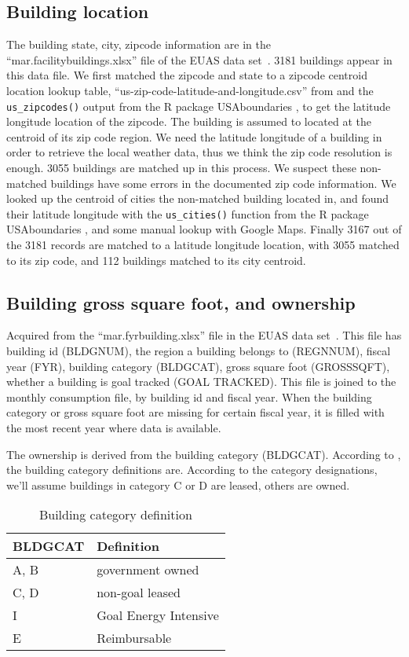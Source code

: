 \documentclass[12pt]{article}
\begin{document}
\subsection{Building location} The building state, city, zipcode information are in
the ``mar.facilitybuildings.xlsx'' file of the EUAS data set~\cite{euas2019}.
3181 buildings appear in this data file. We first matched the zipcode and state
to a zipcode centroid location lookup table,
``us-zip-code-latitude-and-longitude.csv'' from \cite{civicSpace2020} and the
\texttt{us\_zipcodes()} output from the R package USAboundaries \cite{USAboundaries2018},
to get the latitude longitude location of the zipcode. The building is assumed
to located at the centroid of its zip code region. We need the latitude
longitude of a building in order to retrieve the local weather data, thus we
think the zip code resolution is enough. 3055 buildings are matched up in this
process. We suspect these non-matched buildings have some errors in the
documented zip code information. We looked up the centroid of cities the
non-matched building located in, and found their latitude longitude with the
\texttt{us\_cities()} function from the R package USAboundaries \cite{USAboundaries2018},
and some manual lookup with Google Maps. Finally 3167 out of the 3181 records
are matched to a latitude longitude location, with 3055 matched to its zip code,
and 112 buildings matched to its city centroid.

\subsection{Building gross square foot, and ownership} Acquired from the
``mar.fyrbuilding.xlsx'' file in the EUAS data set~\cite{euas2019}. This file
has building id (BLDGNUM), the region a building belongs to (REGNNUM), fiscal
year (FYR), building category (BLDGCAT), gross square foot (GROSSSQFT), whether
a building is goal tracked (GOAL TRACKED). This file is joined to the monthly
consumption file, by building id and fiscal year. When the building category or
gross square foot are missing for certain fiscal year, it is filled with the
most recent year where data is available.

The ownership is derived from the building category (BLDGCAT). According to
\cite{Burke2017}, the building category definitions are. According to the
category designations, we'll assume buildings in category C or D are leased,
others are owned.

\begin{table}[H]
  \caption{Building category definition}
  \centering
  \fontsize{10}{12}\selectfont
  \begin{tabular}{l|l}
  \toprule
    BLDGCAT & Definition \\
    \midrule 
    A, B & government owned \\
    C, D & non-goal leased \\
    I & Goal Energy Intensive \\
    E & Reimbursable \\
    \bottomrule
  \end{tabular}
  \label{tab:building_cat}
\end{table}
\end{document}

